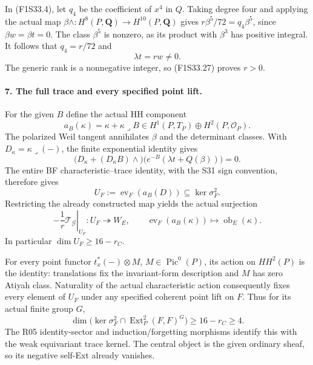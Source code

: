 In (F1S33.4), let $q_4$ be the coefficient of
$x^4$ in $Q$. Taking degree four and applying
the actual map
$\beta\wedge:H^8(P,\mathbf Q)\to H^{10}(P,\mathbf Q)$
gives
$r\beta^5/72=q_4\beta^5$,
since $\beta w=\beta t=0$.
The class $\beta^5$ is nonzero, as its product
with $\beta^3$ has positive integral.
It follows that $q_4=r/72$ and
\[
                         \lambda t=rw\ne0.
 \tag{F1S33.27}
\]
The generic rank is a nonnegative integer, so
(F1S33.27) proves $r>0$.

\paragraph{7. The full trace and every specified point lift.}
For the given $B$ define the actual HH component
\[
 a_B(\kappa)=\kappa+\kappa\mathbin{\lrcorner}B
       \in H^1(P,T_P)\oplus H^2(P,\mathcal O_P).
 \tag{F1S33.28}
\]
The polarized Weil tangent annihilates $\beta$
and the determinant classes. With
$D_\kappa=\kappa\mathbin{\lrcorner}(-)$,
the finite exponential identity gives
\[
 \bigl(D_\kappa+(D_\kappa B)\wedge\bigr)
       \bigl(e^{-B}(\lambda t+Q(\beta))\bigr)=0.
 \tag{F1S33.29}
\]
The entire BF characteristic--trace identity,
with the S31 sign convention, therefore gives
\[
 U_F:=\operatorname{ev}_F(a_B(D))
                         \subseteq\ker\sigma_F^2.
 \tag{F1S33.30}
\]
Restricting the already constructed map yields
the actual surjection
\[
 \left.-\frac1r\mathcal T_{\mathcal G}\right|_{U_F}:
     U_F\twoheadrightarrow W_E,\qquad
 \operatorname{ev}_F(a_B(\kappa))
                         \longmapsto\operatorname{ob}_E(\kappa).
 \tag{F1S33.31}
\]
In particular $\dim U_F\ge16-r_C$.

For every point functor $t_x^*(-)\otimes M$,
$M\in\operatorname{Pic}^0(P)$, its action on
$HH^2(P)$ is the identity: translations fix the
invariant-form description and $M$ has zero
Atiyah class. Naturality of the actual
characteristic action consequently fixes every
element of $U_F$ under any specified coherent
point lift on $F$.
Thus for its actual finite group $G$,
\[
 \dim\bigl(\ker\sigma_F^2
           \cap\operatorname{Ext}^2_P(F,F)^G\bigr)
                             \ge16-r_C\ge4.
 \tag{F1S33.32}
\]
The R05 identity-sector and induction/forgetting
morphisms identify this with the weak equivariant
trace kernel. The central object is the given
ordinary sheaf, so its negative self-Ext already
vanishes.

